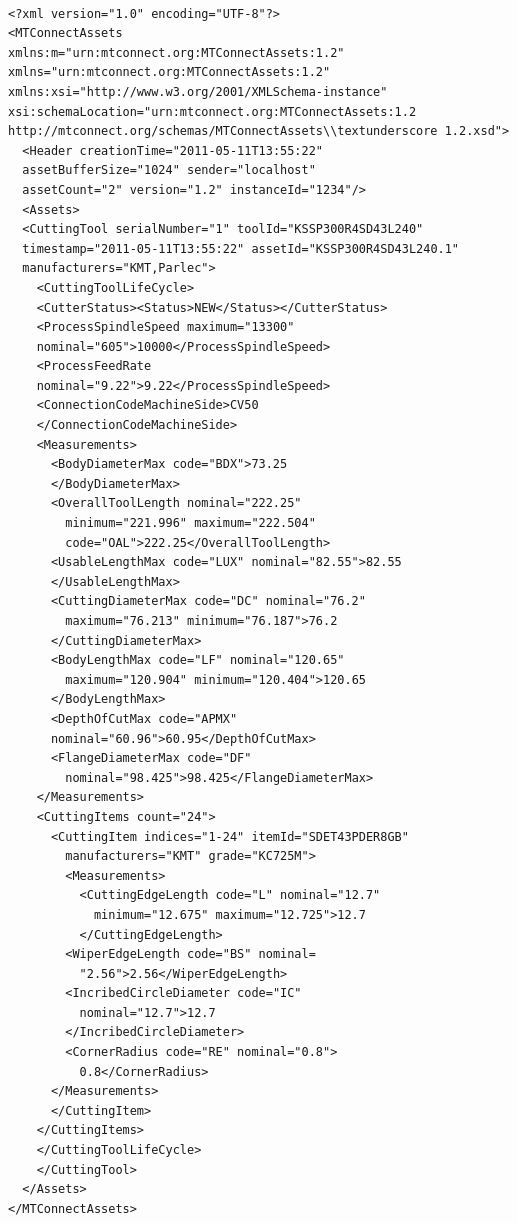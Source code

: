 \FloatBarrier


	\begin{lstlisting}[firstnumber=1,escapechar=|,% 
	caption={Example for Indexable Insert Measurements}, label={lst:Example for Indexable Insert Measurements}]
	
<?xml version="1.0" encoding="UTF-8"?>
<MTConnectAssets 
xmlns:m="urn:mtconnect.org:MTConnectAssets:1.2" 
xmlns="urn:mtconnect.org:MTConnectAssets:1.2" 
xmlns:xsi="http://www.w3.org/2001/XMLSchema-instance" 
xsi:schemaLocation="urn:mtconnect.org:MTConnectAssets:1.2
http://mtconnect.org/schemas/MTConnectAssets\\textunderscore 1.2.xsd">
  <Header creationTime="2011-05-11T13:55:22" 
  assetBufferSize="1024" sender="localhost"
  assetCount="2" version="1.2" instanceId="1234"/>
  <Assets>
  <CuttingTool serialNumber="1" toolId="KSSP300R4SD43L240" 
  timestamp="2011-05-11T13:55:22" assetId="KSSP300R4SD43L240.1" 
  manufacturers="KMT,Parlec">
    <CuttingToolLifeCycle>
    <CutterStatus><Status>NEW</Status></CutterStatus>
    <ProcessSpindleSpeed maximum="13300" 
    nominal="605">10000</ProcessSpindleSpeed>
    <ProcessFeedRate
    nominal="9.22">9.22</ProcessSpindleSpeed>
    <ConnectionCodeMachineSide>CV50
    </ConnectionCodeMachineSide>
    <Measurements>
      <BodyDiameterMax code="BDX">73.25
      </BodyDiameterMax>
      <OverallToolLength nominal="222.25" 
        minimum="221.996" maximum="222.504" 
        code="OAL">222.25</OverallToolLength>
      <UsableLengthMax code="LUX" nominal="82.55">82.55
      </UsableLengthMax>
      <CuttingDiameterMax code="DC" nominal="76.2" 
        maximum="76.213" minimum="76.187">76.2
      </CuttingDiameterMax>
      <BodyLengthMax code="LF" nominal="120.65" 
        maximum="120.904" minimum="120.404">120.65
      </BodyLengthMax>
      <DepthOfCutMax code="APMX" 
      nominal="60.96">60.95</DepthOfCutMax>
      <FlangeDiameterMax code="DF" 
        nominal="98.425">98.425</FlangeDiameterMax>
    </Measurements>
    <CuttingItems count="24">
      <CuttingItem indices="1-24" itemId="SDET43PDER8GB" 
        manufacturers="KMT" grade="KC725M">
        <Measurements>
          <CuttingEdgeLength code="L" nominal="12.7" 
            minimum="12.675" maximum="12.725">12.7
          </CuttingEdgeLength>
        <WiperEdgeLength code="BS" nominal=
          "2.56">2.56</WiperEdgeLength>
        <IncribedCircleDiameter code="IC"
          nominal="12.7">12.7
        </IncribedCircleDiameter>
        <CornerRadius code="RE" nominal="0.8">
          0.8</CornerRadius>
      </Measurements>
      </CuttingItem>
    </CuttingItems>
    </CuttingToolLifeCycle>
    </CuttingTool>
  </Assets>
</MTConnectAssets>

	\end{lstlisting}


